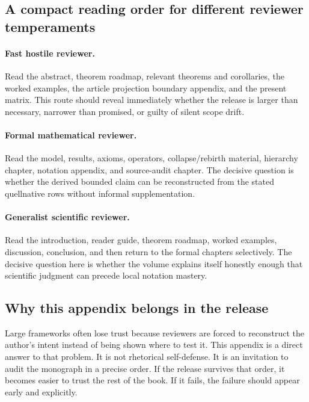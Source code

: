 \subsection{A compact reading order for different reviewer temperaments}

\paragraph{Fast hostile reviewer.}
Read the abstract, theorem roadmap, relevant theorems and corollaries, the worked examples,
the article projection boundary appendix, and the present matrix. This route should reveal immediately
whether the release is larger than necessary, narrower than promised, or guilty of silent scope
drift.

\paragraph{Formal mathematical reviewer.}
Read the model, results, axioms, operators, collapse/rebirth material, hierarchy chapter,
notation appendix, and source-audit chapter. The decisive question is whether the derived bounded
claim can be reconstructed from the stated quellnative rows without informal supplementation.

\paragraph{Generalist scientific reviewer.}
Read the introduction, reader guide, theorem roadmap, worked examples, discussion, conclusion,
and then return to the formal chapters selectively. The decisive question here is whether the
volume explains itself honestly enough that scientific judgment can precede local notation
mastery.

\subsection{Why this appendix belongs in the release}

Large frameworks often lose trust because reviewers are forced to reconstruct the author's intent
instead of being shown where to test it. This appendix is a direct answer to that problem. It is
not rhetorical self-defense. It is an invitation to audit the monograph in a precise order.
If the release survives that order, it becomes easier to trust the rest of the book. If it fails,
the failure should appear early and explicitly.

\clearpage

